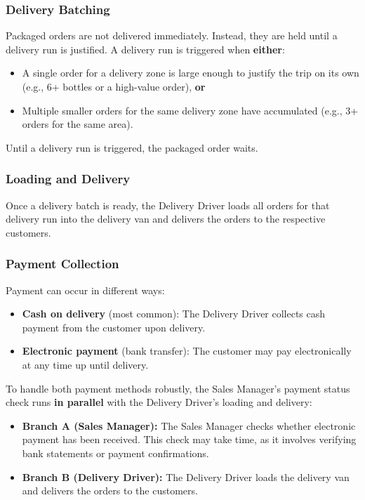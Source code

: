 \documentclass[11pt,a4paper]{article}
\begin{document}
\subsubsection{Delivery Batching}

Packaged orders are not delivered immediately. Instead, they are held until a delivery run is justified. A delivery run is triggered when \textbf{either}:
\begin{itemize}
    \item A single order for a delivery zone is large enough to justify the trip on its own (e.g., 6+ bottles or a high-value order), \textbf{or}
    \item Multiple smaller orders for the same delivery zone have accumulated (e.g., 3+ orders for the same area).
\end{itemize}
Until a delivery run is triggered, the packaged order waits.

\subsubsection{Loading and Delivery}

Once a delivery batch is ready, the Delivery Driver loads all orders for that delivery run into the delivery van and delivers the orders to the respective customers.

\subsubsection{Payment Collection}

Payment can occur in different ways:
\begin{itemize}
    \item \textbf{Cash on delivery} (most common): The Delivery Driver collects cash payment from the customer upon delivery.
    \item \textbf{Electronic payment} (bank transfer): The customer may pay electronically at any time up until delivery.
\end{itemize}

To handle both payment methods robustly, the Sales Manager's payment status check runs \textbf{in parallel} with the Delivery Driver's loading and delivery:
\begin{itemize}
    \item \textbf{Branch A (Sales Manager):} The Sales Manager checks whether electronic payment has been received. This check may take time, as it involves verifying bank statements or payment confirmations.
    \item \textbf{Branch B (Delivery Driver):} The Delivery Driver loads the delivery van and delivers the orders to the customers.
\end{itemize}
\end{document}
